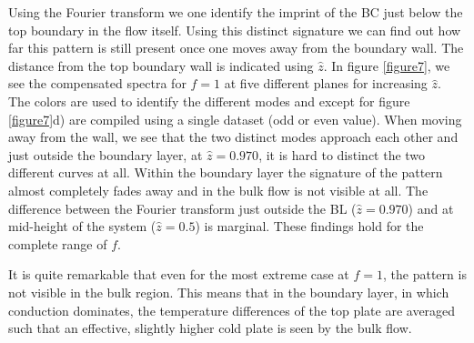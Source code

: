 \documentclass{jfm}
\begin{document}
Using the Fourier transform we one identify the imprint of the BC just below
the top boundary in the flow itself.  Using this distinct signature we can
find out how far this pattern is still present once one moves away from the
boundary wall.  The distance from the top boundary wall is indicated using
$\hat{z}$.  In figure \ref{figure7}, we see the compensated spectra for $f=1$
at five different planes for increasing $\hat{z}$.  The colors are used to
identify the different modes and except for figure \ref{figure7}d)
are compiled using a single dataset (odd or even value). 
When moving away from the wall, we see that the two distinct
modes approach each other and just outside the boundary layer, at
$\hat{z}=0.970$, it is hard to distinct the two different curves at all.
Within the boundary layer the signature of the pattern almost completely fades
away and in the bulk flow is not visible at all.  The difference between the
Fourier transform just outside the BL ($\hat{z}=0.970$) and at mid-height of
the system ($\hat{z}=0.5$) is marginal.  These findings hold for the complete
range of $f$.

It is quite remarkable that even for the most extreme case at $f=1$, the
pattern is not visible in the bulk region.  This means that in the boundary
layer, in which conduction dominates, the temperature differences of the top
plate are averaged such that an effective, slightly higher cold plate is seen
by the bulk flow.
\end{document}
